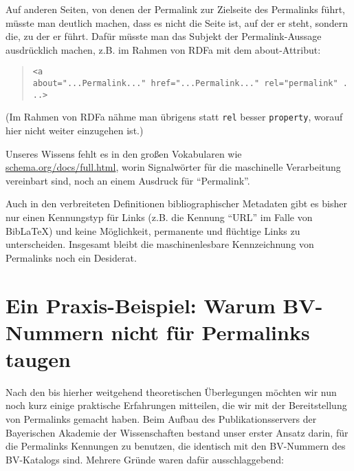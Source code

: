 \documentclass[12pt, a4paper]{article}
\begin{document}
Auf anderen Seiten, von denen der Permalink zur Zielseite des
Permalinks führt, müsste man deutlich machen, dass es nicht die Seite
ist, auf der er steht, sondern die, zu der er führt. Dafür müsste man
das Subjekt der Permalink-Aussage ausdrücklich machen, z.B. im Rahmen
von RDFa mit dem about-Attribut:

\begin{quote}
\texttt{<a
  about="...Permalink..."\ href="...Permalink..."\ rel="permalink"\ ...>}
\end{quote}

(Im Rahmen von RDFa nähme man übrigens statt \texttt{rel} besser
\texttt{property}, worauf hier nicht weiter einzugehen ist.)

Unseres Wissens fehlt es in den großen Vokabularen wie
\href{http://schema.org/docs/full.html}{schema.org/\-docs/\-full.html},
worin Signalwörter für die maschinelle Verarbeitung vereinbart sind,
noch an einem Ausdruck für "`Permalink"'.

Auch in den verbreiteten Definitionen bibliographischer Metadaten gibt
es bisher nur einen Kennungstyp für Links (z.B. die Kennung "`URL"' im
Falle von BibLaTeX) und keine Möglichkeit, permanente und flüchtige
Links zu unterscheiden. Insgesamt bleibt die maschinenlesbare
Kennzeichnung von Permalinks noch ein Desiderat.

\section{Ein Praxis-Beispiel: Warum BV-Nummern nicht für Permalinks
  taugen}
\label{ein-praxis-beispiel-warum-bv-nummern-nicht-fuer-permalinks-taugen}

Nach den bis hierher weitgehend theoretischen Überlegungen möchten wir
nun noch kurz einige praktische Erfahrungen mitteilen, die wir mit der
Bereitstellung von Permalinks gemacht haben. Beim Aufbau des
Publikationsservers der Bayerischen Akademie der Wissenschaften
bestand unser erster Ansatz darin, für die Permalinks Kennungen zu
benutzen, die identisch mit den BV-Nummern des BV-Katalogs
sind. Mehrere Gründe waren dafür ausschlaggebend:
\end{document}
